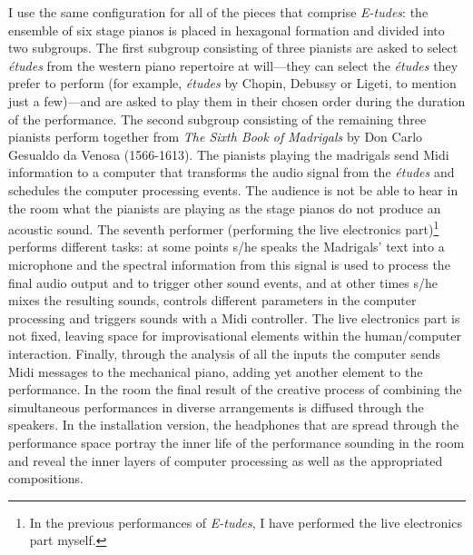 I use the same configuration for all of the pieces that comprise \emph{E-tudes}: the ensemble of six stage pianos is placed in hexagonal formation and divided into two subgroups. The first subgroup consisting of three pianists are asked to select \emph{\'{e}tudes} from the western piano repertoire at will---they can select the \emph{\'{e}tudes} they prefer to perform (for example, \emph{\'{e}tudes} by Chopin, Debussy or Ligeti, to mention just a few)---and are asked to play them in their chosen order during the duration of the performance. The second subgroup consisting of the remaining three pianists perform together from \emph{The Sixth Book of Madrigals} by Don Carlo Gesualdo da Venosa (1566-1613). The pianists playing the madrigals send Midi information to a computer that transforms the audio signal from the \emph{\'{e}tudes} and schedules the computer processing events. The audience is not be able to hear in the room what the pianists are playing as the stage pianos do not produce an acoustic sound. The seventh performer (performing the live electronics part)\footnote{In the previous performances of \emph{E-tudes}, I have performed the live electronics part myself.} performs different tasks: at some points s/he speaks the Madrigals' text into a microphone and the spectral information from this signal is used to process the final audio output and to trigger other sound events, and at other times s/he mixes the resulting sounds, controls different parameters in the computer processing and  triggers sounds with a Midi controller. The live electronics part is not fixed, leaving space for improvisational elements within the human/computer interaction. Finally, through the analysis of all the inputs the computer sends Midi messages to the mechanical piano, adding yet another element to the performance. In the room the final result of the creative process of combining the simultaneous performances in diverse arrangements is diffused through the speakers. In the installation version, the headphones that are spread through the performance space portray the inner life of the performance sounding in the room and reveal the inner layers of computer processing as well as the appropriated compositions.

